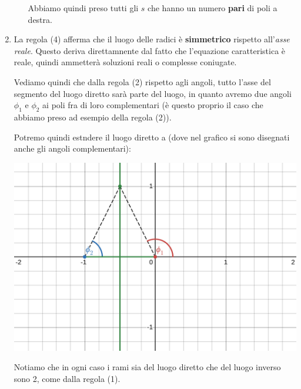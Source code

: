 \documentclass[a4paper,11pt]{article}
\begin{document}
\begin{enumerate}
\begin{itemize}
				Abbiamo quindi preso tutti gli $s$ che hanno un numero \textbf{pari} di poli a destra.
		\end{itemize}

	\item
		La regola (4) afferma che il luogo delle radici è \textbf{simmetrico} rispetto all'\textit{asse reale}.
		Questo deriva direttamnente dal fatto che l'equazione caratteristica è reale, quindi ammetterà soluzioni reali o complesse coniugate.

		Vediamo quindi che dalla regola (2) rispetto agli angoli, tutto l'asse del segmento del luogo diretto sarà parte del luogo, in quanto avremo due angoli $\phi_1$ e $\phi_2$ ai poli fra di loro complementari (è questo proprio il caso che abbiamo preso ad esempio della regola (2)).

		Potremo quindi estndere il luogo diretto a (dove nel grafico si sono disegnati anche gli angoli complementari):
		\begin{center}
			\includegraphics[scale=0.26]{../figures/locus_dc.png}
		\end{center}
		
		Notiamo che in ogni caso i rami sia del luogo diretto che del luogo inverso sono 2, come dalla regola (1).
\end{enumerate}
\end{document}
